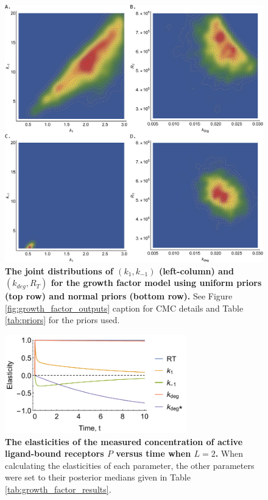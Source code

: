 \begin{figure}[H]
	\centerline{\includegraphics[width=\textwidth]{../figures/growth_factor_inputs.png}}
	\caption{\textbf{The joint distributions of $(k_1,k_{-1})$ (left-column) and $(k_{deg},R_T)$ for the growth factor model using uniform priors (top row) and normal priors (bottom row).} See Figure \ref{fig:growth_factor_outputs} caption for CMC details and Table \ref{tab:priors} for the priors used.}
	\label{fig:growth_factor_inputs}
\end{figure}

\begin{figure}[H]
	\centerline{\includegraphics[width=0.7\textwidth]{../figures/dixit_elasticities.pdf}}
	\caption{\textbf{The elasticities of the measured concentration of active ligand-bound receptors $P$ versus time when $L=2$.} When calculating the elasticities of each parameter, the other parameters were set to their posterior medians given in Table \ref{tab:growth_factor_results}.}
	\label{fig:dixit_elasticities}
\end{figure}

